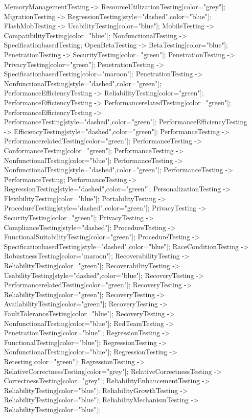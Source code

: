\documentclass{article}
\begin{document}
{MemoryManagementTesting -> ResourceUtilizationTesting[color="grey"];
MigrationTesting -> RegressionTesting[style="dashed",color="blue"];
FlashMobTesting -> UsabilityTesting[color="blue"];
MobileTesting -> CompatibilityTesting[color="blue"];
NonfunctionalTesting -> SpecificationbasedTesting;
OpenBetaTesting -> BetaTesting[color="blue"];
PenetrationTesting -> SecurityTesting[color="green"];
PenetrationTesting -> PrivacyTesting[color="green"];
PenetrationTesting -> SpecificationbasedTesting[color="maroon"];
PenetrationTesting -> NonfunctionalTesting[style="dashed",color="green"];
PerformanceEfficiencyTesting -> ReliabilityTesting[color="green"];
PerformanceEfficiencyTesting -> PerformancerelatedTesting[color="green"];
PerformanceEfficiencyTesting -> PerformanceTesting[style="dashed",color="green"];
PerformanceEfficiencyTesting -> EfficiencyTesting[style="dashed",color="green"];
PerformanceTesting -> PerformancerelatedTesting[color="green"];
PerformanceTesting -> ConformanceTesting[color="green"];
PerformanceTesting -> NonfunctionalTesting[color="blue"];
PerformanceTesting -> NonfunctionalTesting[style="dashed",color="green"];
PerformanceTesting -> PerformanceTesting;
PerformanceTesting -> RegressionTesting[style="dashed",color="green"];
PersonalizationTesting -> FlexibilityTesting[color="blue"];
PortabilityTesting -> ProcedureTesting[style="dashed",color="green"];
PrivacyTesting -> SecurityTesting[color="green"];
PrivacyTesting -> ComplianceTesting[style="dashed"];
ProcedureTesting -> FunctionalSuitabilityTesting[color="green"];
ProcedureTesting -> SpecificationbasedTesting[style="dashed",color="blue"];
RaceConditionTesting -> RobustnessTesting[color="maroon"];
RecoverabilityTesting -> ReliabilityTesting[color="green"];
RecoverabilityTesting -> UsabilityTesting[style="dashed",color="blue"];
RecoveryTesting -> PerformancerelatedTesting[color="green"];
RecoveryTesting -> ReliabilityTesting[color="green"];
RecoveryTesting -> AvailabilityTesting[color="green"];
RecoveryTesting -> FaultToleranceTesting[color="blue"];
RecoveryTesting -> NonfunctionalTesting[color="blue"];
RedTeamTesting -> PenetrationTesting[color="blue"];
RegressionTesting -> FunctionalTesting[color="blue"];
RegressionTesting -> NonfunctionalTesting[color="blue"];
RegressionTesting -> Retesting[color="green"];
RegressionTesting -> RelativeCorrectnessTesting[color="grey"];
RelativeCorrectnessTesting -> CorrectnessTesting[color="grey"];
ReliabilityEnhancementTesting -> ReliabilityTesting[color="blue"];
ReliabilityGrowthTesting -> ReliabilityTesting[color="blue"];
ReliabilityMechanismTesting -> ReliabilityTesting[color="blue"];
}
\end{document}
